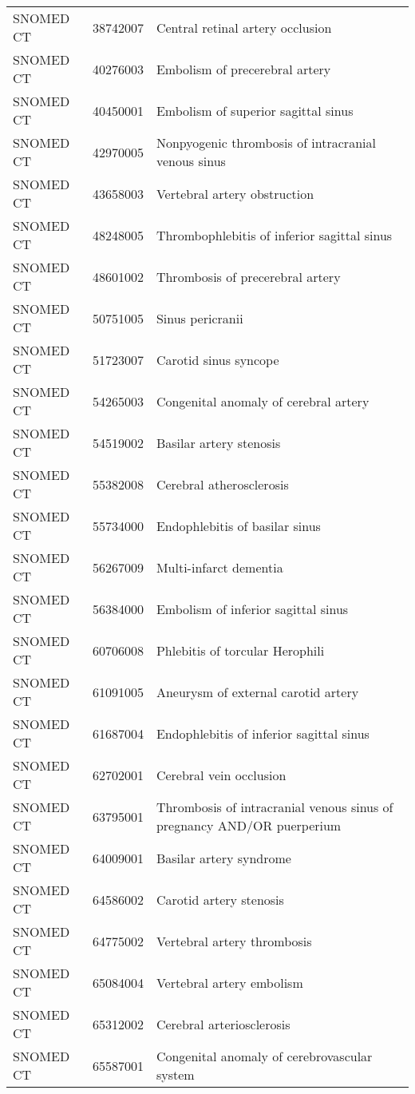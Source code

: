 \begin{longtable}{p{}p{}p{}}
  SNOMED CT & 38742007 & Central retinal artery occlusion \\ 
  SNOMED CT & 40276003 & Embolism of precerebral artery \\ 
  SNOMED CT & 40450001 & Embolism of superior sagittal sinus \\ 
  SNOMED CT & 42970005 & Nonpyogenic thrombosis of intracranial venous sinus \\ 
  SNOMED CT & 43658003 & Vertebral artery obstruction \\ 
  SNOMED CT & 48248005 & Thrombophlebitis of inferior sagittal sinus \\ 
  SNOMED CT & 48601002 & Thrombosis of precerebral artery \\ 
  SNOMED CT & 50751005 & Sinus pericranii \\ 
  SNOMED CT & 51723007 & Carotid sinus syncope \\ 
  SNOMED CT & 54265003 & Congenital anomaly of cerebral artery \\ 
  SNOMED CT & 54519002 & Basilar artery stenosis \\ 
  SNOMED CT & 55382008 & Cerebral atherosclerosis \\ 
  SNOMED CT & 55734000 & Endophlebitis of basilar sinus \\ 
  SNOMED CT & 56267009 & Multi-infarct dementia \\ 
  SNOMED CT & 56384000 & Embolism of inferior sagittal sinus \\ 
  SNOMED CT & 60706008 & Phlebitis of torcular Herophili \\ 
  SNOMED CT & 61091005 & Aneurysm of external carotid artery \\ 
  SNOMED CT & 61687004 & Endophlebitis of inferior sagittal sinus \\ 
  SNOMED CT & 62702001 & Cerebral vein occlusion \\ 
  SNOMED CT & 63795001 & Thrombosis of intracranial venous sinus of pregnancy AND/OR puerperium \\ 
  SNOMED CT & 64009001 & Basilar artery syndrome \\ 
  SNOMED CT & 64586002 & Carotid artery stenosis \\ 
  SNOMED CT & 64775002 & Vertebral artery thrombosis \\ 
  SNOMED CT & 65084004 & Vertebral artery embolism \\ 
  SNOMED CT & 65312002 & Cerebral arteriosclerosis \\ 
  SNOMED CT & 65587001 & Congenital anomaly of cerebrovascular system \\ 

\end{longtable}
